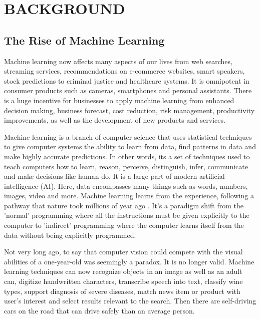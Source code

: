 
\chapter{BACKGROUND}

\graphicspath{ {./background/} }
\thispagestyle{empty}


\section{The Rise of Machine Learning}

Machine learning now affects many aspects of our lives from web searches, streaming services, recommendations on e-commerce websites, smart speakers, stock predictions to criminal justice and healthcare systems. It is omnipotent in consumer products such as cameras, smartphones and personal assistants. There is a huge incentive for businesses to apply machine learning from enhanced decision making, business forecast, cost reduction, risk management, productivity improvements, as well as the development of new products and services.

Machine learning is a branch of computer science that uses statistical techniques to give computer systems the ability to learn from data, find patterns in data and make highly accurate predictions. In other words, its a set of techniques used to teach computers how to learn, reason, perceive, distinguish, infer, communicate and make decisions like human do. It is a large part of modern artificial intelligence (AI). Here, data encompasses many things such as words, numbers, images, video and more. Machine learning learns from the experience, following a pathway that nature took millions of year ago \cite{sammut2011encyclopedia}. It's a paradigm shift from the 'normal' programming where all the instructions must be given explicitly to the computer to 'indirect' programming where the computer learns itself from the data without being explicitly programmed.

Not very long ago, to say that computer vision could compete with the visual abilities of a one-year-old was seemingly a paradox\cite{sejnowski2018deep}. It is no longer valid. Machine learning techniques can now recognize objects in an image as well as an adult can, digitize handwritten characters, transcribe speech into text, classify wine types, support diagnosis of severe diseases, match news item or product with user's interest and select results relevant to the search. Then there are self-driving cars \cite{sejnowski2018deep} on the road that can drive safely than an average person. 

